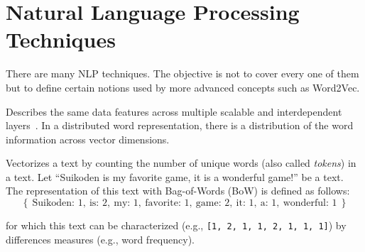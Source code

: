 
\section{Natural Language Processing Techniques}
\label{sec:background:nlp:techniques}

There are many NLP techniques. The objective is not to cover every one of them
but to define certain notions used by more advanced concepts such as Word2Vec.

\begin{definition}
  Describes the same data features across multiple scalable and interdependent
  layers~\citep{website:deepai:distributed:representation}. In a distributed word
  representation, there is a distribution of the word information across vector
  dimensions.
  \label{def:distributed:reprensetation}
\end{definition}

\begin{definition}
  Vectorizes a text by counting the number of unique words (also called
  \emph{tokens}) in a text. Let ``Suikoden is my favorite game, it is a wonderful
  game!'' be a text. The representation of this text with Bag-of-Words (BoW) is
  defined as follows:
  \begin{equation}
    \left\{\ \text{Suikoden: } 1,\ \text{is: } 2,\ \text{my: } 1,\ \text{favorite: } 1,\
      \text{game: } 2,\ \text{it: } 1, \ \text{a: } 1,\ \text{wonderful: } 1\ \right\}
  \end{equation}

  for which this text can be characterized (e.g., \texttt{[1, 2, 1, 1, 2, 1, 1,
    1]}) by differences measures (e.g., word frequency).
  \label{def:bow}
\end{definition}

